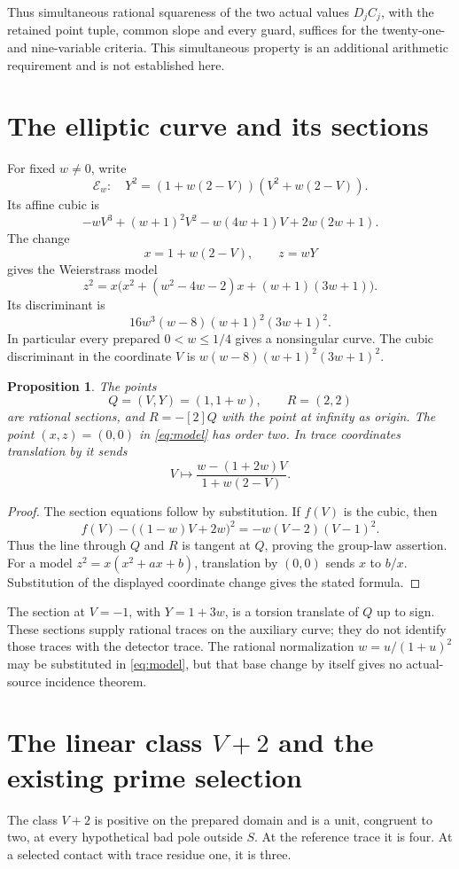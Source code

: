 \documentclass[11pt,a4paper]{article}
\newtheorem{proposition}[theorem]{Proposition}
\begin{document}
Thus simultaneous rational squareness of the two actual values $D_jC_j$,
with the retained point tuple, common slope and every guard, suffices for
the twenty-one- and nine-variable criteria. This simultaneous property
is an additional arithmetic requirement and is not established here.

\section{The elliptic curve and its sections}
For fixed $w\ne0$, write
\[
 \mathcal E_w:\quad
 Y^2=(1+w(2-V))(V^2+w(2-V)).
\]
Its affine cubic is
\[
 -wV^3+(w+1)^2V^2-w(4w+1)V+2w(2w+1).
\]
The change
\[
 x=1+w(2-V),\qquad z=wY
\]
gives the Weierstrass model
\begin{equation}\label{eq:model}
 z^2=x\bigl(x^2+(w^2-4w-2)x+(w+1)(3w+1)\bigr).
\end{equation}
Its discriminant is
\[
 16w^3(w-8)(w+1)^2(3w+1)^2.
\]
In particular every prepared $0<w\le1/4$ gives a nonsingular curve.
The cubic discriminant in the coordinate $V$ is
$w(w-8)(w+1)^2(3w+1)^2$.

\begin{proposition}
The points
\[
 Q=(V,Y)=(1,1+w),\qquad R=(2,2)
\]
are rational sections, and $R=-[2]Q$ with the point at infinity as
origin. The point $(x,z)=(0,0)$ in \eqref{eq:model} has order two.
In trace coordinates translation by it sends
\[
 V\longmapsto\frac{w-(1+2w)V}{1+w(2-V)}.
\]
\end{proposition}
\begin{proof}
The section equations follow by substitution. If $f(V)$ is the cubic,
then
\[
 f(V)-\bigl((1-w)V+2w\bigr)^2
       =-w(V-2)(V-1)^2.
\]
Thus the line through $Q$ and $R$ is tangent at $Q$, proving the
group-law assertion. For a model $z^2=x(x^2+ax+b)$, translation
by $(0,0)$ sends $x$ to $b/x$. Substitution of the displayed
coordinate change gives the stated formula.
\end{proof}

The section at $V=-1$, with $Y=1+3w$, is a torsion translate of
$Q$ up to sign. These sections supply rational traces on the auxiliary
curve; they do not identify those traces with the detector trace.
The rational normalization $w=u/(1+u)^2$ may be substituted in
\eqref{eq:model}, but that base change by itself gives no actual-source
incidence theorem.

\section{The linear class $V+2$ and the existing prime selection}
The class $V+2$ is positive on the prepared domain and is a unit,
congruent to two, at every hypothetical bad pole outside $S$.
At the reference trace it is four. At a selected contact with trace
residue one, it is three.
\end{document}
